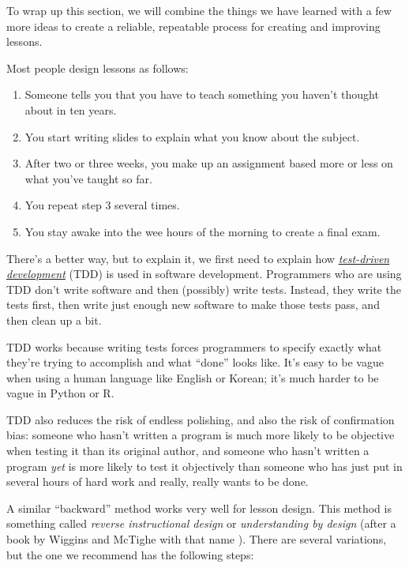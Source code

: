 
To wrap up this section, we will combine the things we have learned
with a few more ideas to create a reliable, repeatable process for
creating and improving lessons.

Most people design lessons as follows:

\begin{enumerate}

\item
  Someone tells you that you have to teach something you haven't
  thought about in ten years.

\item
  You start writing slides to explain what you know about the subject.

\item
  After two or three weeks, you make up an assignment based more or
  less on what you've taught so far.

\item
  You repeat step 3 several times.

\item
  You stay awake into the wee hours of the morning to create a final
  exam.

\end{enumerate}

There's a better way, but to explain it, we first need to explain how
\emph{\href{https://en.wikipedia.org/wiki/Test-driven\_development}{test-driven
development}} (TDD) is used in software development.  Programmers who
are using TDD don't write software and then (possibly) write tests.
Instead, they write the tests first, then write just enough new
software to make those tests pass, and then clean up a bit.

TDD works because writing tests forces programmers to specify exactly
what they're trying to accomplish and what ``done'' looks like. It's
easy to be vague when using a human language like English or Korean;
it's much harder to be vague in Python or R.

TDD also reduces the risk of endless polishing, and also the risk of
confirmation bias: someone who hasn't written a program is much more
likely to be objective when testing it than its original author, and
someone who hasn't written a program \emph{yet} is more likely to test
it objectively than someone who has just put in several hours of hard
work and really, really wants to be done.

A similar ``backward'' method works very well for lesson design.  This
method is something called \emph{reverse instructional design} or
\emph{understanding by design} (after a book by Wiggins and McTighe
with that name \cite{fixme}).  There are several variations, but the
one we recommend has the following steps:

